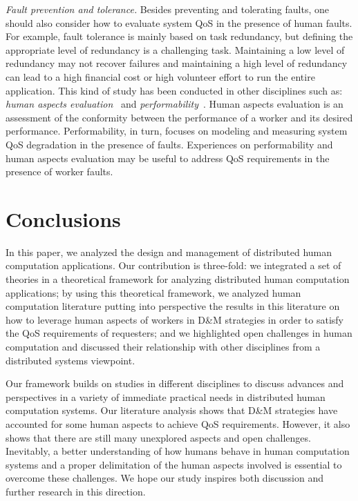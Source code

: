 \documentclass[11pt]{bmc_article_s50}
\begin{document}
\textit{Fault prevention and tolerance.} Besides preventing and tolerating faults, one should also consider how to evaluate system QoS in the presence of human faults. For example, fault tolerance is mainly based on task redundancy, but defining the appropriate level of redundancy is a challenging task. Maintaining a low level of redundancy may not recover failures and maintaining a high level of redundancy can lead to a high financial cost or high volunteer effort to run the entire application. This kind of study has been conducted in other disciplines such as: \textit{human aspects evaluation}~\cite{Whitefield:BehaviourInformationTechnology:1991} and \textit{performability}~\cite{misra2008handbook}. Human aspects evaluation is an assessment of the conformity between the performance of a worker and its desired performance. Performability, in turn, focuses on modeling and measuring system QoS degradation in the presence of faults. Experiences on performability and human aspects evaluation may be useful to address QoS requirements in the presence of worker faults.\vspace*{-5pt} 

\section{Conclusions}

In this paper, we analyzed the design and management of distributed human computation applications. Our contribution is three-fold:  we integrated a set of theories in a theoretical framework for analyzing distributed human computation applications;  by using this theoretical framework, we analyzed human computation literature putting into perspective the results in this literature on how to leverage human aspects of workers in D\&M strategies in order to satisfy the QoS requirements of requesters; and  we highlighted open challenges in human computation and discussed their relationship with other disciplines from a distributed systems viewpoint.

Our framework builds on studies in different disciplines to discuss advances and perspectives in a variety of immediate practical needs in distributed human computation systems. Our literature analysis shows that D\&M strategies have accounted for some human aspects to achieve QoS requirements. However, it also shows that there are still many unexplored aspects and open challenges. Inevitably, a better understanding of how humans behave in human computation systems and a proper delimitation of the human aspects involved is essential to overcome these challenges. We hope our study inspires both discussion and further research in this direction.\vspace*{-5pt} 
\end{document}
